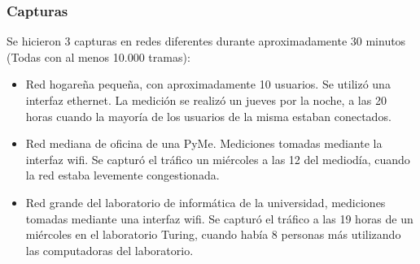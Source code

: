 \subsubsection*{Capturas}
Se hicieron 3 capturas en redes diferentes durante aproximadamente 30 minutos (Todas con al menos 10.000 tramas):
\begin{itemize}
	\item Red hogareña pequeña, con aproximadamente 10 usuarios. Se utilizó una interfaz ethernet. La medición se realizó un jueves por la noche, a las 20 horas cuando la mayoría de los usuarios de la misma estaban conectados.
	\item Red mediana de oficina de una PyMe. Mediciones tomadas mediante la interfaz wifi. Se capturó el tráfico un miércoles a las 12 del mediodía, cuando la red estaba levemente congestionada.
	\item Red grande del laboratorio de informática de la universidad, mediciones tomadas mediante una interfaz wifi. Se capturó el tráfico a las 19 horas de un miércoles en el laboratorio Turing, cuando había 8 personas más utilizando las computadoras del laboratorio.
\end{itemize}
